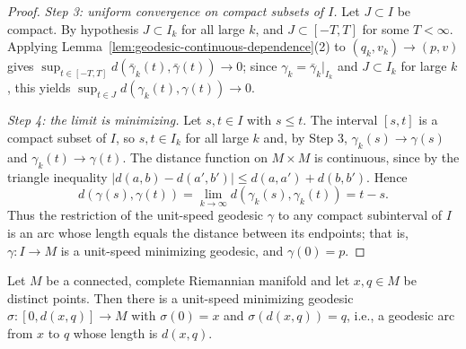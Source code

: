 \begin{proof}
{\em Step 3: uniform convergence on compact subsets of $I$.} Let
$J\subset I$ be compact. By hypothesis $J\subset I_k$ for all large
$k$, and $J\subset[-T,T]$ for some $T<\infty$. Applying
Lemma~\ref{lem:geodesic-continuous-dependence}(2) to
$(q_k,v_k)\rightarrow(p,v)$ gives
$\sup_{t\in[-T,T]}d(\bar\gamma_k(t),\bar\gamma(t))\rightarrow0$;
since $\gamma_k=\bar\gamma_k|_{I_k}$ and $J\subset I_k$ for large
$k$, this yields
$\sup_{t\in J}d(\gamma_k(t),\gamma(t))\rightarrow0$.

{\em Step 4: the limit is minimizing.} Let $s,t\in I$ with $s\le t$.
The interval $[s,t]$ is a compact subset of $I$, so $s,t\in I_k$ for
all large $k$ and, by Step 3, $\gamma_k(s)\rightarrow\gamma(s)$ and
$\gamma_k(t)\rightarrow\gamma(t)$. The distance function on $M\times
M$ is continuous, since by the triangle inequality
$|d(a,b)-d(a',b')|\le d(a,a')+d(b,b')$. Hence
$$d(\gamma(s),\gamma(t))
=\lim_{k\rightarrow\infty}d(\gamma_k(s),\gamma_k(t))=t-s.$$
Thus the restriction of the unit-speed geodesic $\gamma$ to any
compact subinterval of $I$ is an arc whose length equals the distance
between its endpoints; that is, $\gamma\colon I\to M$ is a unit-speed
minimizing geodesic, and $\gamma(0)=p$.
\end{proof}

\begin{lemma}
\label{lem:minimizing-segment-exists}
\leanok
{}
Let $M$ be a connected, complete Riemannian manifold and let $x,q\in M$ be
distinct points. Then there is a unit-speed minimizing geodesic
$\sigma\colon [0,d(x,q)]\to M$ with $\sigma(0)=x$ and
$\sigma(d(x,q))=q$, i.e., a geodesic arc from $x$ to $q$ whose
length is $d(x,q)$.
\end{lemma}

